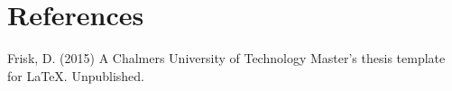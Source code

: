 \chapter{References}
\begin{thebibliography}{69}

 Frisk, D. (2015) A Chalmers University of Technology Master's thesis template for \LaTeX . Unpublished.

\end{thebibliography}

